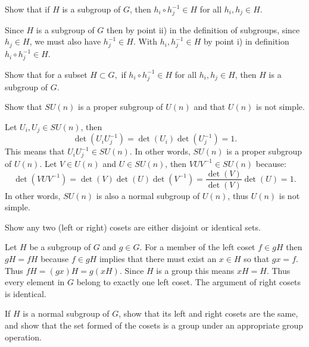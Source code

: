 \documentclass[notes.tex]{subfiles}
\begin{document}
\begin{Exercise}[difficulty=1]
Show that if $H$ is a subgroup of $G$, then $h_i \circ h_j^{-1} \in H$ for all $h_i, h_j\in H$.
\end{Exercise}
\begin{Answer}
Since $H$ is a subgroup of $G$ then by point ii) in the definition of subgroups, since $h_j\in H$, we must also have $h_j^{-1} \in H$. With $h_i, h_j^{-1} \in H$ by point i) in definition $h_i  \circ h_j^{-1} \in H$.
\end{Answer}

\begin{Exercise}[difficulty=2]
Show that for a subset $H\subset G,$ if $h_i \circ h_j^{-1} \in H$ for all $h_i, h_j\in H$, then $H$ is a subgroup of $G$.
\end{Exercise}
\begin{Answer}
\end{Answer}

\begin{Exercise}[label=ex:SUn_normal,difficulty=1]
Show that $SU(n)$ is a proper subgroup of $U(n)$ and that $U(n)$ is not simple.
\end{Exercise}
\begin{Answer}
Let $U_i, U_j \in SU(n)$, then 
\[\det(U_i U_j^{-1}) = \det(U_i)\det(U_j^{-1}) = 1.\]
This means that $U_i U^{-1}_j \in SU(n)$. In other words, $SU(n)$ is a proper subgroup of $U(n)$. Let $V \in U(n)$ and $U \in SU(n)$, then $VUV^{-1} \in SU(n)$ because:
\[\det(VUV^{-1}) = \det(V)\det(U)\det(V^{-1}) = \frac{\det(V)}{\det(V)} \det(U) = 1.\]
In other words, $SU(n)$ is also a normal subgroup of $U(n)$, thus $U(n)$ is not simple.
\end{Answer}

\begin{Exercise}[difficulty=2]
Show any two (left or right) cosets are either disjoint or identical sets.
\end{Exercise}
\begin{Answer}
Let $H$ be a subgroup of $G$ and $g\in G$. For a member of the left coset $f\in gH$ then $gH=fH$ because $f\in gH$ implies that there must exist an $x\in H$ so that $gx=f$. Thus $fH=(gx)H=g(xH)$. Since $H$ is a group this means $xH=H$.  Thus every element in $G$ belong to exactly one left coset. The argument of right cosets is identical.
\end{Answer}

\begin{Exercise}[]
If $H$ is a normal subgroup of $G$, show that its left and right cosets are the same, and show that the set formed of the cosets is a group under an appropriate group operation.
\end{Exercise}
\end{document}
